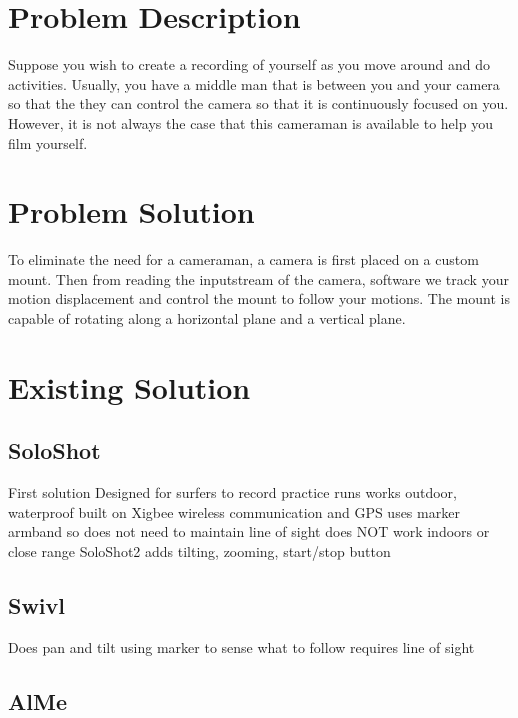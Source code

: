 \documentclass[12pt]{article}
\begin{document}
\maketitle

\section{Problem Description}
Suppose you wish to create a recording of yourself as you move around and do activities. Usually, you have a middle man that is between you and your camera so that the they can control the camera so that it is continuously focused on you. However, it is not always the case that this cameraman is available to help you film yourself.

\section{Problem Solution}
To eliminate the need for a cameraman, a camera is first placed on a custom mount. Then from reading the inputstream of the camera, software we track your motion displacement and control the mount to follow your motions. The mount is capable of rotating along a horizontal plane and a vertical plane.

\section{Existing Solution}
\subsection{SoloShot}
First solution
Designed for surfers to record practice runs
works outdoor, waterproof
built on Xigbee wireless communication and GPS
uses marker armband so does not need to maintain line of sight
does NOT work indoors or close range
SoloShot2 adds tilting, zooming, start/stop button

\subsection{Swivl}
Does pan and tilt using marker to sense what to follow
requires line of sight

\subsection{AlMe}
\end{document}
